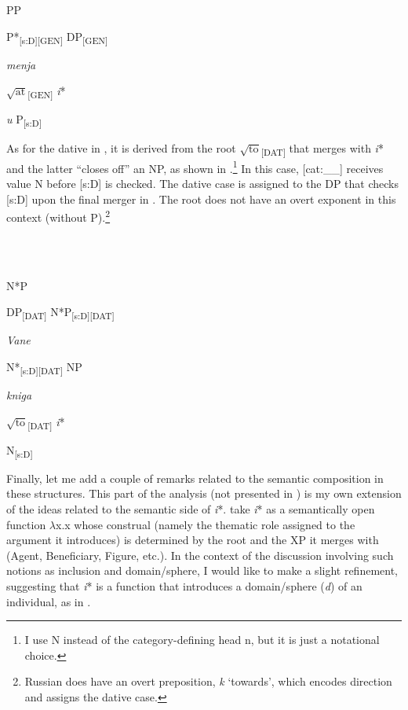 \documentclass[output=paper,modfonts,nonflat]{langsci/langscibook}
\begin{document}
               PP

  P*\textsubscript{[s:D][GEN]}  DP\textsubscript{[GEN]}  

    \textit{menja}

   $\sqrt{\text{at}}$\textsubscript{[GEN]}  \textit{i}*

  \textit{u}  P\textsubscript{[s:D]}  

As for the dative in , it is derived from the root  $\sqrt{\text{to}}$\textsubscript{[DAT]} that merges with \textit{i}* and the latter “closes off” an NP, as shown in .\footnote{I use N instead of the category-defining head n, but it is just a notational choice.} In this case, [cat:\_\_] receives value N before [s:D] is checked. The dative case is assigned to the DP that checks [s:D] upon the final merger in . The root does not have an overt exponent in this context (without P).\footnote{Russian does have an overt preposition, \textit{k} ‘towards’, which encodes direction and assigns the dative case.}  

\ea%
    \label{ex:key:18}
    \gll\\
        \\
    \glt
    \z

          N*P

  DP\textsubscript{[DAT]}  N*P\textsubscript{[s:D][DAT]}

  \textit{Vane}

  N*\textsubscript{[s:D][DAT]}  NP

    \textit{kniga}

   $\sqrt{\text{to}}$\textsubscript{[DAT]}  \textit{i}*

    N\textsubscript{[s:D]}

Finally, let me add a couple of remarks related to the semantic composition in these structures. This part of the analysis (not presented in \citealt{Tsedryk2019}) is my own extension of the ideas related to the semantic side of \textit{i}*. \citet{WoodMarantz2017} take \textit{i}* as a semantically open function ${\lambda}$x.x whose construal (namely the thematic role assigned to the argument it introduces) is determined by the root and the XP it merges with (Agent, Beneficiary, Figure, etc.). In the context of the discussion involving such notions as inclusion and domain/sphere, I would like to make a slight refinement, suggesting that \textit{i}* is a function that introduces a domain/sphere (\textit{d}) of an individual, as in . 
\end{document}
